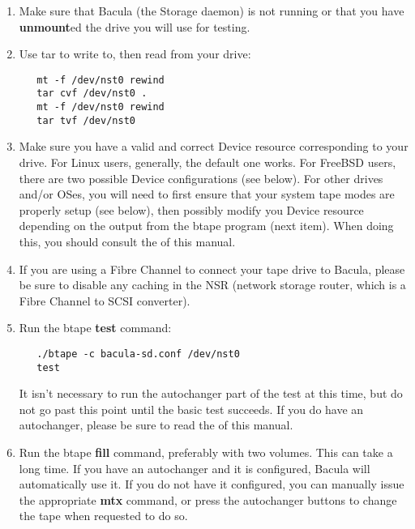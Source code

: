 \begin{enumerate}
\item Make sure that Bacula (the Storage daemon) is not running
  or that you have {\bf unmount}ed the drive you will use
  for testing.

\item Use tar to write to, then read from your drive:

   \footnotesize
\begin{verbatim}
   mt -f /dev/nst0 rewind
   tar cvf /dev/nst0 .
   mt -f /dev/nst0 rewind
   tar tvf /dev/nst0

\end{verbatim}
\normalsize

\item Make sure you have a valid and correct Device resource corresponding
   to your drive.  For Linux users, generally, the default one works.  For
   FreeBSD users, there are two possible Device configurations (see below).
   For other drives and/or OSes, you will need to first ensure that your
   system tape modes are properly setup (see below), then possibly modify
   you Device resource depending on the output from the btape program (next
   item). When doing this, you should consult the  of this manual.

\item If you are using a Fibre Channel to connect your tape drive to
   Bacula, please be sure to disable any caching in the NSR (network
   storage router, which is a Fibre Channel to SCSI converter).

\item Run the btape {\bf test} command:

   \footnotesize
\begin{verbatim}
   ./btape -c bacula-sd.conf /dev/nst0
   test

\end{verbatim}
\normalsize

   It isn't necessary to run the autochanger part of the test at this time,
   but do not go past this point until the basic test succeeds.  If you do
   have an autochanger, please be sure to read the  of this manual.

\item Run the btape {\bf fill} command, preferably with two volumes.  This
   can take a long time. If you have an autochanger and it  is configured, Bacula
   will automatically use it. If you do  not have it configured, you can manually
   issue the appropriate  {\bf mtx} command, or press the autochanger buttons to
   change  the tape when requested to do so.


\end{enumerate}
